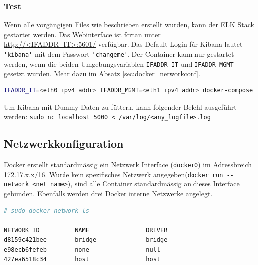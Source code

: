 \subsubsection{Test}
Wenn alle vorgängigen Files wie beschrieben erstellt wurden, kann der ELK Stack gestartet werden. Das Webinterface ist fortan unter \url{http://<IFADDR_IT>:5601/} verfügbar. Das Default Login für Kibana lautet \lstinline[]|'kibana'| mit dem Passwort \lstinline[]|'changeme'|. Der Container kann nur gestartet werden, wenn die beiden Umgebungsvariablen \lstinline|IFADDR_IT| und \lstinline|IFADDR_MGMT| gesetzt wurden. Mehr dazu im Absatz \ref{sec:docker_networkconf}.
\begin{lstlisting}[language=bash]
IFADDR_IT=<eth0 ipv4 addr> IFADDR_MGMT=<eth1 ipv4 addr> docker-compose up
\end{lstlisting}

Um Kibana mit Dummy Daten zu füttern, kann folgender Befehl ausgeführt werden: \lstinline[]|sudo nc localhost 5000 < /var/log/<any_logfile>.log|

\subsection{Netzwerkkonfiguration}
Docker erstellt standardmässig ein Netzwerk Interface (\lstinline[]|docker0|) im Adressbreich 172.17.x.x/16. Wurde kein spezifisches Netzwerk angegeben(\lstinline[]|docker run --network <net name>|), sind alle Container standardmässig an dieses Interface gebunden. Ebenfalls werden drei Docker interne Netzwerke angelegt.
\begin{lstlisting}[language=bash]
# sudo docker network ls

NETWORK ID          NAME                DRIVER
d8159c421bee        bridge              bridge              
e98ecb6fefeb        none                null                
427ea6518c34        host                host    
\end{lstlisting}

